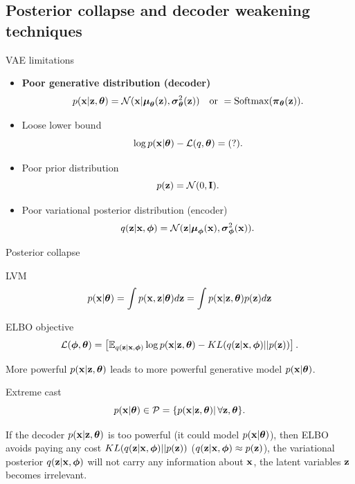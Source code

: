 \subsection{Posterior collapse and decoder weakening techniques}
\begin{frame}{VAE limitations}
	\begin{itemize}
		\item \textbf{Poor generative distribution (decoder)}
		\[
			p(\mathbf{x} | \mathbf{z}, \boldsymbol{\theta}) = \mathcal{N}(\mathbf{x}| \boldsymbol{\mu}_{\boldsymbol{\theta}}(\mathbf{z}), \boldsymbol{\sigma}^2_{\boldsymbol{\theta}}(\mathbf{z})) \quad \text{or } = \text{Softmax}(\boldsymbol{\pi}_{\boldsymbol{\theta}}(\mathbf{z})).
		\]
		\item Loose lower bound
		\[
			\log p(\mathbf{x} | \boldsymbol{\theta}) - \mathcal{L}(q, \boldsymbol{\theta}) = (?).
		\]
		\item Poor prior distribution
		\[
			p(\mathbf{z}) = \mathcal{N}(0, \mathbf{I}).
		\]
		\item Poor variational posterior distribution (encoder)
		\[
			q(\mathbf{z} | \mathbf{x}, \boldsymbol{\phi}) = \mathcal{N}(\mathbf{z}| \boldsymbol{\mu}_{\boldsymbol{\phi}}(\mathbf{x}), \boldsymbol{\sigma}^2_{\boldsymbol{\phi}}(\mathbf{x})).
		\]
	\end{itemize}
\end{frame}
\begin{frame}{Posterior collapse}
	\begin{block}{LVM}
		\vspace{-0.3cm}
		\[
		p(\mathbf{x} | \boldsymbol{\theta}) = \int p(\mathbf{x}, \mathbf{z} | \boldsymbol{\theta}) d \mathbf{z} = \int p(\mathbf{x} | \mathbf{z}, \boldsymbol{\theta}) p(\mathbf{z}) d \mathbf{z} 
		\]
		\vspace{-0.5cm}
	\end{block}
	\begin{block}{ELBO objective}
		\vspace{-0.3cm}
		\[
		\mathcal{L}(\boldsymbol{\phi}, \boldsymbol{\theta}) = \left[ \mathbb{E}_{q(\mathbf{z} | \mathbf{x}, \boldsymbol{\phi})} \log p(\mathbf{x} | \mathbf{z}, \boldsymbol{\theta}) - KL(q(\mathbf{z} | \mathbf{x}, \boldsymbol{\phi}) || p(\mathbf{z})) \right].
		\]
	\end{block}
	More powerful $p(\mathbf{x} | \mathbf{z}, \boldsymbol{\theta})$ leads to more powerful generative model $p(\mathbf{x} | \boldsymbol{\theta})$.
	\begin{block}{Extreme cast}
		\vspace{-0.3cm}
		\[
			p(\mathbf{x} | \boldsymbol{\theta}) \in \mathcal{P} = \{ p(\mathbf{x} | \mathbf{z}, \boldsymbol{\theta}) | \, \forall \mathbf{z}, \boldsymbol{\theta}\}.
		\]
	\end{block}
	If the decoder $p(\mathbf{x} | \mathbf{z}, \boldsymbol{\theta})$ is too powerful (it could  model $p(\mathbf{x} | \boldsymbol{\theta})$), then ELBO avoids paying any cost $KL(q(\mathbf{z}| \mathbf{x}, \boldsymbol{\phi})||p(\mathbf{z}))$ ($q(\mathbf{z}| \mathbf{x}, \boldsymbol{\phi}) \approx p(\mathbf{z})$), the variational posterior $q(\mathbf{z} | \mathbf{x}, \boldsymbol{\phi})$ will not carry any information about $\mathbf{x}$, the latent variables $\mathbf{z}$ becomes irrelevant.
\end{frame}

